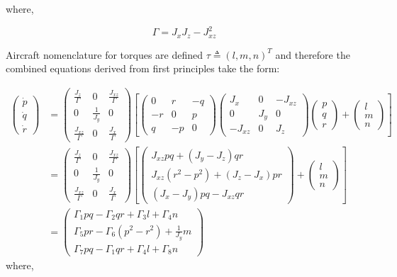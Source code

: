 where,

\begin{equation}
\Gamma = J_xJ_z-J_{xz}^2
\end{equation}

Aircraft nomenclature for torques are defined $\tau\triangleq(l,m,n)^T$ and therefore the combined equations derived from first principles take the form:

\begin{equation}
\begin{split}
	\begin{pmatrix}
		\dot{p} \\
		\dot{q} \\
		\dot{r} 
	\end{pmatrix}
	&=
	\begin{pmatrix}
	\frac{J_z}{\Gamma} & 0 & \frac{J_{xz}}{\Gamma}\\
	0 & \frac{1}{J_y} & 0\\
	\frac{J_{xz}}{\Gamma} & 0 & \frac{J_x}{\Gamma}
	\end{pmatrix}
	\left[
	\begin{pmatrix}
		0& r& -q \\
		-r& 0& p \\
		q& -p& 0
	\end{pmatrix}
	\begin{pmatrix}
	J_x & 0 & -J_{xz}\\
	0 & J_y & 0\\
	-J_{xz} & 0 & J_z
	\end{pmatrix}
	\begin{pmatrix}
		p\\
		q\\
		r
	\end{pmatrix} +
	\begin{pmatrix}
		l\\
		m\\
		n
	\end{pmatrix}
	\right] \\	
	&=
	\begin{pmatrix}
		\frac{J_z}{\Gamma} & 0 & \frac{J_{xz}}{\Gamma}\\
		0 & \frac{1}{J_y} & 0\\
		\frac{J_{xz}}{\Gamma} & 0 & \frac{J_x}{\Gamma}
	\end{pmatrix}
	\left[
	\begin{pmatrix}
	J_{xz}pq+(J_y-J_z)qr\\
	J_{xz}(r^2-p^2)+(J_z-J_x)pr\\
	(J_x-J_y)pq-J_{xz}qr
	\end{pmatrix}+
	\begin{pmatrix}
		l\\
		m\\
		n
	\end{pmatrix}
	\right]\\	
	&=
	\begin{pmatrix}
		\Gamma_1pq-\Gamma_2qr+\Gamma_3l+\Gamma_4n\\
		\Gamma_5pr-\Gamma_6(p^2-r^2)+\frac{1}{J_y}m\\
		\Gamma_7pq-\Gamma_1qr+\Gamma_4l+\Gamma_8n
	\end{pmatrix}
	\end{split}		
\end{equation}
where,

